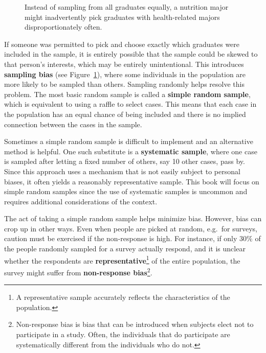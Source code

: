 \documentclass[
  letterpaper,
  DIV=11,
  numbers=noendperiod]{scrreprt}
\begin{document}
\begin{figure}


\caption{\label{fig-biased}Instead of sampling from all graduates
equally, a nutrition major might inadvertently pick graduates with
health-related majors disproportionately often.}

\end{figure}%

If someone was permitted to pick and choose exactly which graduates were
included in the sample, it is entirely possible that the sample could be
skewed to that person's interests, which may be entirely unintentional.
This introduces \textbf{sampling bias} (see Figure~\ref{fig-biased}),
where some individuals in the population are more likely to be sampled
than others. Sampling randomly helps resolve this problem. The most
basic random sample is called a \textbf{simple random sample}, which is
equivalent to using a raffle to select cases. This means that each case
in the population has an equal chance of being included and there is no
implied connection between the cases in the sample.

Sometimes a simple random sample is difficult to implement and an
alternative method is helpful. One such substitute is a
\textbf{systematic sample}, where one case is sampled after letting a
fixed number of others, say 10 other cases, pass by. Since this approach
uses a mechanism that is not easily subject to personal biases, it often
yields a reasonably representative sample. This book will focus on
simple random samples since the use of systematic samples is uncommon
and requires additional considerations of the context.

The act of taking a simple random sample helps minimize bias. However,
bias can crop up in other ways. Even when people are picked at random,
e.g.~for surveys, caution must be exercised if the non-response is high.
For instance, if only 30\% of the people randomly sampled for a survey
actually respond, and it is unclear whether the respondents are
\textbf{representative}\footnote{A representative sample accurately
  reflects the characteristics of the population.} of the entire
population, the survey might suffer from \textbf{non-response
bias}\footnote{Non-response bias is bias that can be introduced when
  subjects elect not to participate in a study. Often, the individuals
  that do participate are systematically different from the individuals
  who do not.}.
\end{document}
